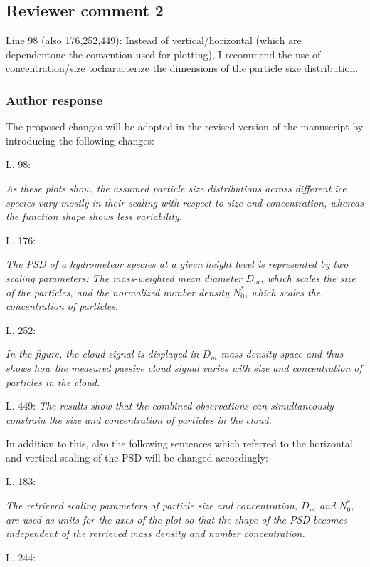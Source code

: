 \documentclass[11pt]{scrartcl}
\begin{document}
\begin{itemize}
\subsection*{Reviewer comment 2}
Line  98  (also  176,252,449):  Instead  of  vertical/horizontal  (which  are  dependentone the convention used for plotting), I recommend the use of concentration/size tocharacterize the dimensions of the particle size distribution.

\subsubsection*{Author response}

The proposed changes will be adopted in the revised version of the manuscript
by introducing the following changes:

L. 98:

\textit{
As these plots show, the
assumed particle size distributions across different ice species vary mostly in
their scaling with respect to size and concentration, whereas the function shape shows less
variability.}

L. 176:

\textit{ The PSD of a hydrometeor species at a given height level is represented
  by two scaling parameters: The mass-weighted mean diameter $D_m$, which scales
  the size of the particles, and the normalized number density $N_0^*$, which
  scales the concentration of particles.}

L. 252:

\textit{ In the figure, the cloud signal is displayed in $D_m$-mass density
  space and thus shows how the measured passive cloud signal varies with size
  and concentration of particles in the cloud. }


L. 449:
\textit{The results show that the combined observations can simultaneously
  constrain the size and concentration of particles in the cloud.}


In addition to this, also the following sentences which referred to the horizontal and vertical
scaling of the PSD will be changed accordingly:

L. 183:

\textit{ The retrieved scaling parameters of particle size and concentration,
  $D_m$ and $N_0^*$, are used as units for the axes of the plot so that the
  shape of the PSD becomes independent of the retrieved mass density and number
  concentration. }

L. 244:


\end{itemize}
\end{document}
